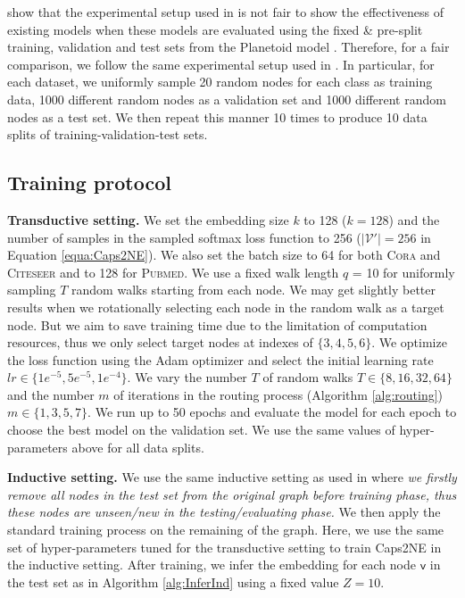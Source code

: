 \documentclass[sigconf]{acmart}
\begin{document}
\citet{duran2017learning} show that the experimental setup used in \citep{kipf2017semi,velickovic2018graph} is not fair to show the effectiveness of existing models when these models are evaluated using the fixed \& pre-split training, validation and test sets from the Planetoid model \citep{Yang:2016planetoid}.
Therefore, for a fair comparison, we follow the same experimental setup used in \citep{duran2017learning,Nguyen2019SANNE}. 
In particular, for each dataset, we uniformly sample 20 random nodes for each class as training data, 1000 different random nodes as a validation set and 1000 different random nodes as a test set.
We then repeat this manner 10 times to produce 10 data splits of training-validation-test sets.

\subsection{Training protocol}
\label{subsec:train}

\textbf{Transductive setting.} We set the embedding size $k$ to 128 ($k = 128$) and the number of samples in the sampled softmax loss function to 256 ($|\mathcal{V'}| = 256$ in Equation \ref{equa:Caps2NE}).
We also set the batch size to 64 for both \textsc{Cora} and \textsc{Citeseer} and to 128 for \textsc{Pubmed}.
We use a fixed walk length $q$ = 10 for uniformly sampling $T$ random walks starting from each node.
We may get slightly better results when we rotationally selecting each node in the random walk as a target node. 
But we aim to save training time due to the limitation of computation resources, thus we only select target nodes at indexes of $\{3, 4, 5, 6\}$.
We optimize the loss function using the Adam optimizer \citep{kingma2014adam} and select the initial learning rate $lr \in \{1e^{-5}, 5e^{-5}, 1e^{-4}\}$.
We vary the number $T$ of random walks $T \in \{8, 16, 32, 64\}$  and the number $m$ of iterations in the routing process (Algorithm \ref{alg:routing}) $m \in \{1, 3, 5, 7\}$.
We run up to 50 epochs and evaluate the model for each epoch to choose the best model on the validation set.
We use the same values of hyper-parameters above for all data splits.


\textbf{Inductive setting.} We use the same inductive setting as used in  \citep{Yang:2016planetoid,duran2017learning} where \textit{we firstly remove all nodes in the test set from the original graph before training phase, thus these nodes  are unseen/new in the testing/evaluating phase.} We then apply the standard training process on the remaining of the graph. 
Here, we use the same set of hyper-parameters tuned for the transductive setting to train Caps2NE in the inductive setting.
After training, we infer the embedding for each node $\mathsf{v}$ in the test set as  in Algorithm \ref{alg:InferInd} using a fixed value $Z=10$.
\end{document}
